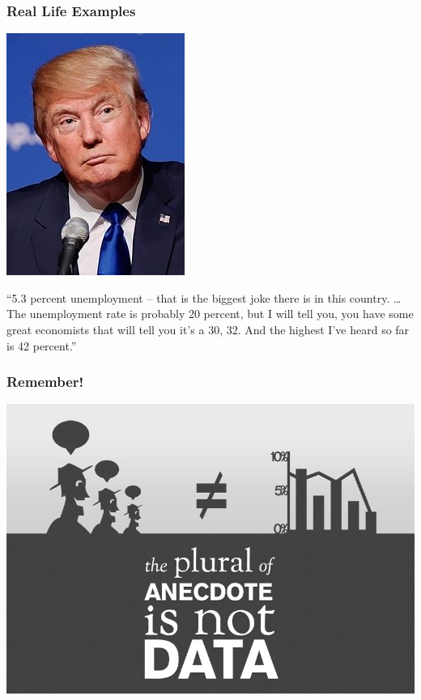 \documentclass{beamer}
\begin{document}
\begin{frame}
	\frametitle{Real Life Examples}
	\begin{center}
		\includegraphics[scale=0.5]{./images/trump.jpg}
	\end{center}
	\centering
	``5.3 percent unemployment -- that is the biggest joke there is in this country. … The 				unemployment rate is probably 20 percent, but I will tell you, you have some great economists 		that will tell you it's a 30, 32. And the highest I've heard so far is 42 percent.''
\end{frame}

\begin{frame}
	\frametitle{Remember!}
	\begin{center}
		\includegraphics[scale=0.35]{./images/anecdote.png}
	\end{center}
\end{frame}
\end{document}
